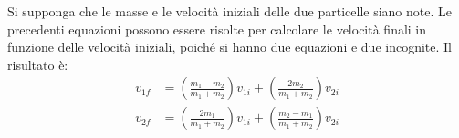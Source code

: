 \documentclass[a4paper,11pt,oneside]{book}
\begin{document}
Si supponga che le masse e le velocità iniziali delle due particelle siano note. Le precedenti equazioni possono essere risolte per calcolare le velocità finali in funzione delle velocità iniziali,
poiché si hanno due equazioni e due incognite. Il risultato è:
\begin{align*}
    v_{1f} &= \left( \frac{m_1 - m_2}{m_1 + m_2} \right) v_{1i} + \left( \frac{2m_2}{m_1 + m_2} \right) v_{2i} \\
    v_{2f} &= \left( \frac{2m_1}{m_1 + m_2} \right) v_{1i} + \left( \frac{m_2 - m_1}{m_1 + m_2} \right) v_{2i}
\end{align*}
\end{document}
